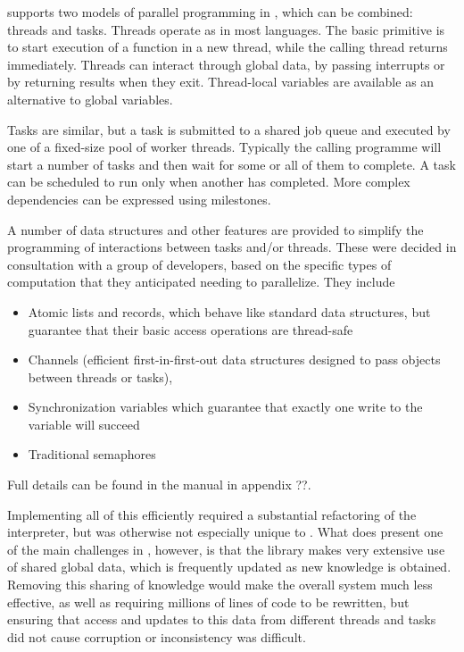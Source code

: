 \documentclass{deliverablereport}
\begin{document}

\HPCGAP supports two models of parallel programming in \GAP, which can
be combined: threads and tasks. Threads operate as in most languages.
The basic primitive is to start execution of a \GAP function in a new
thread, while the calling thread returns immediately. Threads can
interact through global data, by passing interrupts or by returning
results when they exit. Thread-local variables are available as an
alternative to global variables.

Tasks are
similar, but a task is submitted to a shared job queue and executed by
one of a fixed-size pool of worker threads. Typically the calling
programme will start a number of tasks and then wait for some or all
of them to complete. A task can be scheduled to run only when another
has completed. More complex dependencies can be expressed using
milestones.

A number of data structures and other features are provided to
simplify the programming of interactions between tasks and/or
threads. These were decided in consultation with a group of \GAP
developers, based on the specific types of computation that they
anticipated needing to parallelize. They include
\begin{itemize}
\item Atomic lists and records, which behave like standard \GAP data
    structures, but guarantee that their basic access operations are
    thread-safe
  \item Channels (efficient first-in-first-out data structures
    designed to pass objects between threads or tasks),
  \item Synchronization variables which guarantee that exactly one
    write to the variable will succeed
  \item Traditional semaphores
\end{itemize}

Full details can be found in the \HPCGAP manual in appendix ??.

Implementing all of this efficiently required a substantial
refactoring of the \GAP interpreter, but was otherwise not especially
unique to \GAP.  What does present one of the main challenges in \HPCGAP, however, is that the \GAP
library makes very extensive use of shared global data, which is
frequently updated as new knowledge is obtained. Removing this sharing
of knowledge would make the overall system much less effective, as
well as requiring millions of lines of code to be rewritten, but
ensuring that access and updates to this data from different threads
and tasks did not cause corruption or inconsistency was difficult.
\end{document}
